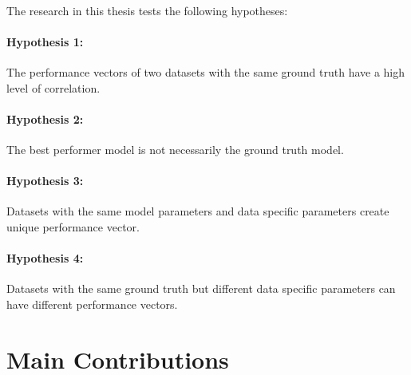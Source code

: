 \paragraph{}The research in this thesis tests the following hypotheses:
\paragraph{Hypothesis 1:} The performance vectors of two datasets with the same ground truth have a high level of correlation.
\paragraph{Hypothesis 2:} The best performer model is not necessarily the ground truth model.
\paragraph{Hypothesis 3:} Datasets with the same model parameters and data specific parameters create unique performance vector. %
\paragraph{Hypothesis 4:} Datasets with the same ground truth but different data specific parameters can have different performance vectors. 
\par{}



\section{Main Contributions}

